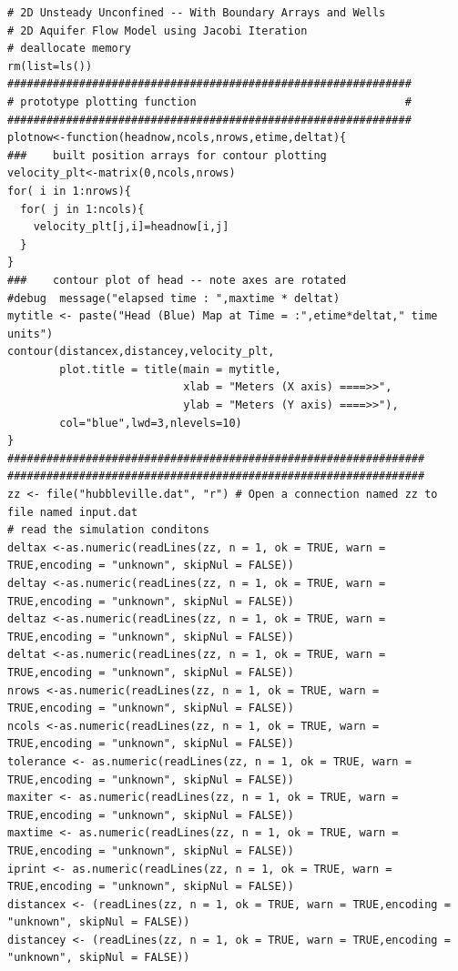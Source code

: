 \begin{lstlisting}[caption= Listing for \textbf{R} implementation for unsteady unconfined flow using Jacobi iteration , label=lst:2DUnsteadyUnconfined]
# 2D Unsteady Unconfined -- With Boundary Arrays and Wells
# 2D Aquifer Flow Model using Jacobi Iteration
# deallocate memory
rm(list=ls())
##############################################################
# prototype plotting function                                #
##############################################################
plotnow<-function(headnow,ncols,nrows,etime,deltat){
###    built position arrays for contour plotting         
velocity_plt<-matrix(0,ncols,nrows) 
for( i in 1:nrows){
  for( j in 1:ncols){
    velocity_plt[j,i]=headnow[i,j]
  }
}
###    contour plot of head -- note axes are rotated
#debug  message("elapsed time : ",maxtime * deltat)
mytitle <- paste("Head (Blue) Map at Time = :",etime*deltat," time units")
contour(distancex,distancey,velocity_plt,
        plot.title = title(main = mytitle,
                           xlab = "Meters (X axis) ====>>", 
                           ylab = "Meters (Y axis) ====>>"),
        col="blue",lwd=3,nlevels=10)
}
################################################################
################################################################
zz <- file("hubbleville.dat", "r") # Open a connection named zz to file named input.dat
# read the simulation conditons
deltax <-as.numeric(readLines(zz, n = 1, ok = TRUE, warn = TRUE,encoding = "unknown", skipNul = FALSE))
deltay <-as.numeric(readLines(zz, n = 1, ok = TRUE, warn = TRUE,encoding = "unknown", skipNul = FALSE))
deltaz <-as.numeric(readLines(zz, n = 1, ok = TRUE, warn = TRUE,encoding = "unknown", skipNul = FALSE))
deltat <-as.numeric(readLines(zz, n = 1, ok = TRUE, warn = TRUE,encoding = "unknown", skipNul = FALSE))
nrows <-as.numeric(readLines(zz, n = 1, ok = TRUE, warn = TRUE,encoding = "unknown", skipNul = FALSE))
ncols <-as.numeric(readLines(zz, n = 1, ok = TRUE, warn = TRUE,encoding = "unknown", skipNul = FALSE))
tolerance <- as.numeric(readLines(zz, n = 1, ok = TRUE, warn = TRUE,encoding = "unknown", skipNul = FALSE))
maxiter <- as.numeric(readLines(zz, n = 1, ok = TRUE, warn = TRUE,encoding = "unknown", skipNul = FALSE))
maxtime <- as.numeric(readLines(zz, n = 1, ok = TRUE, warn = TRUE,encoding = "unknown", skipNul = FALSE))
iprint <- as.numeric(readLines(zz, n = 1, ok = TRUE, warn = TRUE,encoding = "unknown", skipNul = FALSE))
distancex <- (readLines(zz, n = 1, ok = TRUE, warn = TRUE,encoding = "unknown", skipNul = FALSE))
distancey <- (readLines(zz, n = 1, ok = TRUE, warn = TRUE,encoding = "unknown", skipNul = FALSE))

\end{lstlisting}
